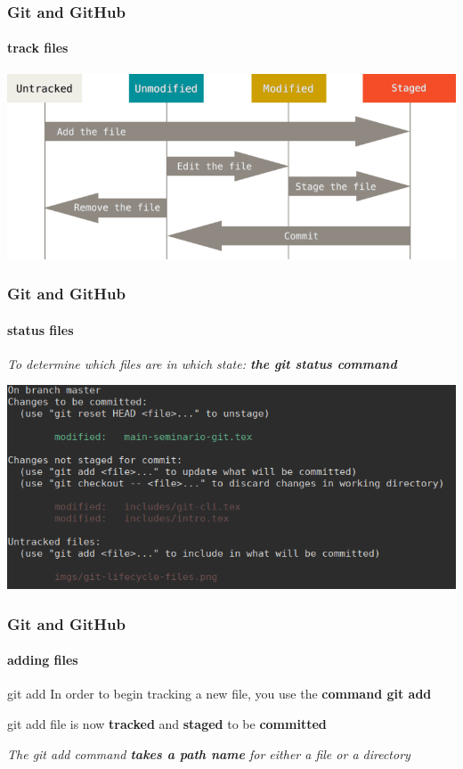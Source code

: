 \begin{frame}
	\frametitle{Git and GitHub}
    \framesubtitle{track files}
    \addtocounter{nframe}{1}

	\begin{center}
		\includegraphics[width=.95\textwidth]{imgs/git-lifecycle-files.png}
	\end{center}

\end{frame}

\begin{frame}
	\frametitle{Git and GitHub}
    \framesubtitle{status files}
    \addtocounter{nframe}{1}

	\textit{To determine which files are in which state: \textbf{the git status command}}

	\begin{center}
		\includegraphics[width=.9\textwidth]{imgs/git-status.png}
	\end{center}

\end{frame}

\begin{frame}
	\frametitle{Git and GitHub}
    \framesubtitle{adding files}
    \addtocounter{nframe}{1}


	\begin{block}{git add}
		In order to begin tracking a new file, you use the \textbf{command git add}
	\end{block}

	\begin{block}{git add}
		file is now \textbf{tracked} and \textbf{staged} to be \textbf{committed}
	\end{block}

	\textit{The git add command \textbf{takes a path name} for either a file or a directory}
	

\end{frame}

